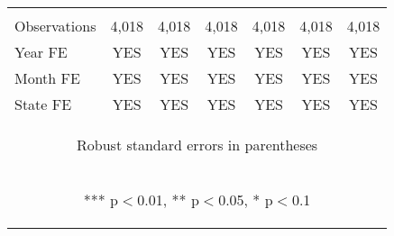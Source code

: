 \begin{center}
\begin{tabular}{lcccccc}
\vspace{4pt} &  &  &  &  &  &  \\
Observations & 4,018 & 4,018 & 4,018 & 4,018 & 4,018 & 4,018 \\
Year FE & YES & YES & YES & YES & YES & YES \\
Month FE & YES & YES & YES & YES & YES & YES \\
 State FE & YES & YES & YES & YES & YES & YES \\ \hline
\multicolumn{7}{c}{\begin{footnotesize} Robust standard errors in parentheses\end{footnotesize}} \\
\multicolumn{7}{c}{\begin{footnotesize} *** p$<$0.01, ** p$<$0.05, * p$<$0.1\end{footnotesize}} \\
\end{tabular}
\end{center}
